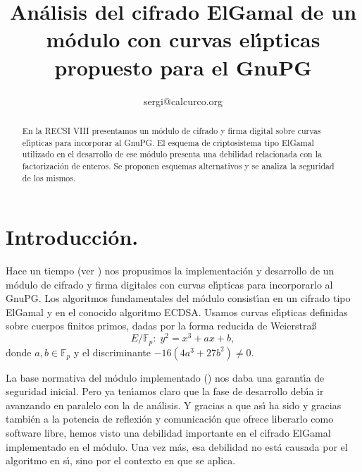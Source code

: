 \documentclass{llncs}
\def\ces{curvas{} el\'{\i}pticas}%
\newcommand{\Fp}{\ensuremath{\mathbb{F}_p}}%
\theoremstyle{plain}        			%
\theoremstyle{definition}   			%
\theoremstyle{saltolinea}   			%
\begin{document}
\title{An\'alisis del cifrado ElGamal de un m\'odulo con \ces{} propuesto para el GnuPG}%


\author{sergi@calcurco.org}

\maketitle



\begin{abstract}
En la RECSI VIII presentamos un m\'odulo de cifrado y firma digital sobre \ces{} para incorporar al GnuPG. El esquema de criptosistema tipo ElGamal utilizado en el desarrollo de ese m\'odulo presenta una debilidad relacionada con la factorizaci\'on de enteros. Se proponen esquemas alternativos y se analiza la seguridad de los mismos.
\end{abstract}

\section{Introducci\'on.} 
Hace un tiempo (ver \cite{bm:proyecto,bm:gnupgces}) nos propusimos la implementaci\'on y desarrollo de un m\'odulo de cifrado y firma digitales con \ces{} para incorporarlo al GnuPG. Los algoritmos fundamentales del m\'odulo consist\'{\i}an en un cifrado tipo ElGamal y en el conocido algoritmo ECDSA. Usamos \ces{} definidas sobre cuerpos finitos primos, dadas por la forma reducida de Weierstra\ss{}
\begin{equation}\label{eq:WRF} E/\Fp:\; y^2=x^3+ax+b,\end{equation}
donde $a,b\in\Fp$ y el discriminante $-16(4a^3+27b^2)\ne 0$.

La base normativa del m\'odulo implementado (\cite{P1363,NIST}) nos daba una garant\'{\i}a de seguridad inicial. Pero ya ten\'{\i}amos claro que la fase de desarrollo deb\'{\i}a ir avanzando en paralelo con la de an\'alisis. Y gracias a que as\'{\i} ha sido y gracias tambi\'en a la potencia de reflexi\'on y comunicaci\'on que ofrece liberarlo como software libre, hemos visto una debilidad importante en el cifrado ElGamal implementado en el m\'odulo. Una vez m\'as, esa debilidad no est\'a causada por el algoritmo en s\'{\i}, sino por el contexto en que se aplica.
\end{document}
